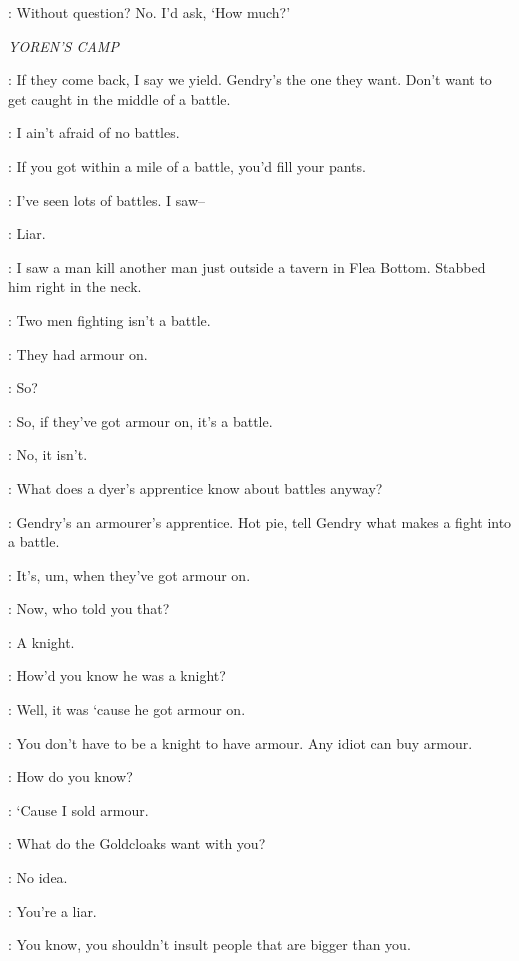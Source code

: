 \BRONN: Without question? No. I'd ask, `How much?'


\scene

\textit{YOREN'S CAMP}

\LOMMY: If they come back, I say we yield. Gendry's the one they want. Don't want to get caught in the middle of a battle.

\HOTPIE: I ain't afraid of no battles.

\ARYA: If you got within a mile of a battle, you'd fill your pants.

\HOTPIE: I've seen lots of battles. I saw--

\ARYA: Liar.

\HOTPIE: I saw a man kill another man just outside a tavern in Flea Bottom. Stabbed him right in the neck.

\LOMMY: Two men fighting isn't a battle.

\HOTPIE: They had armour on.

\ARYA: So?

\HOTPIE: So, if they've got armour on, it's a battle.

\LOMMY: No, it isn't.

\HOTPIE: What does a dyer's apprentice know about battles anyway?


\ARYA: Gendry's an armourer's apprentice. Hot pie, tell Gendry what makes a fight into a battle.

\HOTPIE: It's, um, when they've got armour on.

\GENDRY: Now, who told you that?

\HOTPIE: A knight.

\GENDRY: How'd you know he was a knight?

\HOTPIE: Well, it was `cause he got armour on.

\GENDRY: You don't have to be a knight to have armour. Any idiot can buy armour.

\HOTPIE: How do you know?

\GENDRY: `Cause I sold armour.


\ARYA: What do the Goldcloaks want with you?

\GENDRY: No idea.

\ARYA: You're a liar.

\GENDRY: You know, you shouldn't insult people that are bigger than you.

